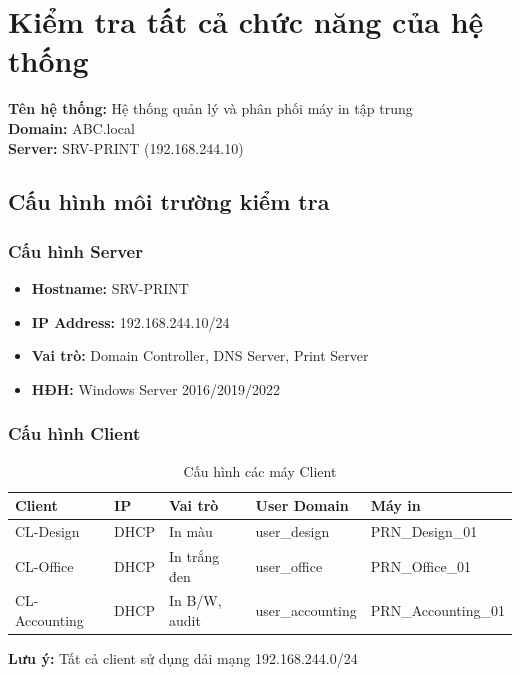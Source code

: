 \chapter{\textbf{Kiểm tra tất cả chức năng của hệ thống}}

\textbf{Tên hệ thống:} Hệ thống quản lý và phân phối máy in tập trung \\
\textbf{Domain:} ABC.local \\
\textbf{Server:} SRV-PRINT (192.168.244.10)

\section{Cấu hình môi trường kiểm tra}

\subsection{Cấu hình Server}
\begin{itemize}
    \item \textbf{Hostname:} SRV-PRINT
    \item \textbf{IP Address:} 192.168.244.10/24
    \item \textbf{Vai trò:} Domain Controller, DNS Server, Print Server
    \item \textbf{HĐH:} Windows Server 2016/2019/2022
\end{itemize}

\subsection{Cấu hình Client}
\begin{table}[htbp]
\centering\small
\begin{tabular}{|l|l|l|l|l|}
\hline
\textbf{Client} & \textbf{IP} & \textbf{Vai trò} & \textbf{User Domain} & \textbf{Máy in} \\ \hline
CL-Design & DHCP & In màu & user\_design & PRN\_Design\_01 \\ \hline
CL-Office & DHCP & In trắng đen & user\_office & PRN\_Office\_01 \\ \hline
CL-Accounting & DHCP & In B/W, audit & user\_accounting & PRN\_Accounting\_01 \\ \hline
\end{tabular}
\caption{Cấu hình các máy Client}
\end{table}

\noindent\textbf{Lưu ý:} Tất cả client sử dụng dải mạng 192.168.244.0/24

